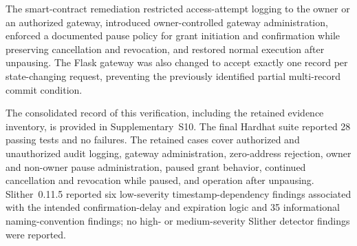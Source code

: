 \documentclass[journal]{IEEEtran}
\begin{document}
The smart-contract remediation restricted access-attempt logging to the owner or an authorized gateway, introduced owner-controlled gateway administration, enforced a documented pause policy for grant initiation and confirmation while preserving cancellation and revocation, and restored normal execution after unpausing. The Flask gateway was also changed to accept exactly one record per state-changing request, preventing the previously identified partial multi-record commit condition.

The consolidated record of this verification, including the retained evidence inventory, is provided in Supplementary~S10. The final Hardhat suite reported 28 passing tests and no failures. The retained cases cover authorized and unauthorized audit logging, gateway administration, zero-address rejection, owner and non-owner pause administration, paused grant behavior, continued cancellation and revocation while paused, and operation after unpausing. Slither~0.11.5 reported six low-severity timestamp-dependency findings associated with the intended confirmation-delay and expiration logic and 35 informational naming-convention findings; no high- or medium-severity Slither detector findings were reported.
\end{document}
